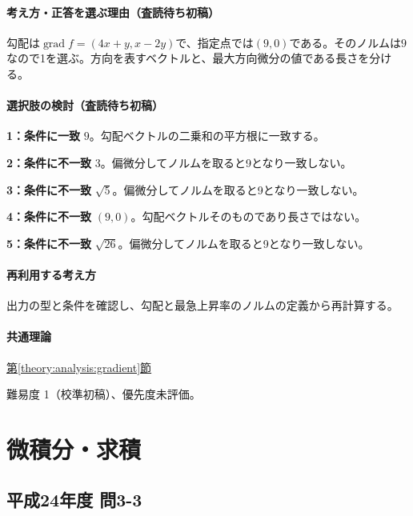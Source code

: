 \paragraph{考え方・正答を選ぶ理由（査読待ち初稿）} 勾配は\(\operatorname{grad}f=(4x+y,x-2y)\)で、指定点では\((9,0)\)である。そのノルムは\(9\)なので1を選ぶ。方向を表すベクトルと、最大方向微分の値である長さを分ける。

\paragraph{選択肢の検討（査読待ち初稿）}\mbox{}\par

\noindent\textbf{1：条件に一致} \(9\)。勾配ベクトルの二乗和の平方根に一致する。\par

\noindent\textbf{2：条件に不一致} \(3\)。偏微分してノルムを取ると9となり一致しない。\par

\noindent\textbf{3：条件に不一致} \(\sqrt5\)。偏微分してノルムを取ると9となり一致しない。\par

\noindent\textbf{4：条件に不一致} \((9,0)\)。勾配ベクトルそのものであり長さではない。\par

\noindent\textbf{5：条件に不一致} \(\sqrt{26}\)。偏微分してノルムを取ると9となり一致しない。\par

\paragraph{再利用する考え方} 出力の型と条件を確認し、勾配と最急上昇率のノルムの定義から再計算する。

\paragraph{共通理論} \hyperref[theory:analysis:gradient]{第\ref*{theory:analysis:gradient}節}

\par 難易度 1（校準初稿）、優先度未評価。

\section{微積分・求積}

\subsection{平成24年度 問3-3}
\label{q:h24-reg-basic-3-3}


